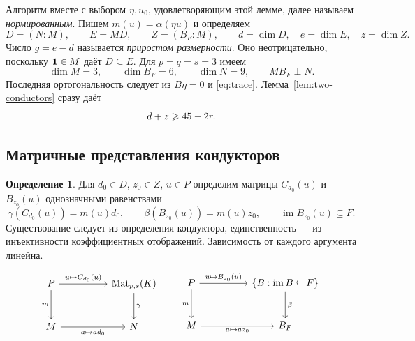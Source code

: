 \documentclass[11pt,a4paper]{article}
\numberwithin{equation}{section}
\theoremstyle{plain}
\theoremstyle{definition}
\newtheorem{definition}[theorem]{Определение}
\DeclareMathOperator{\im}{im}\DeclareMathOperator{\supp}{supp}
\DeclareMathOperator{\Mat}{Mat}\DeclareMathOperator{\Span}{span}
\begin{document}
Алгоритм вместе с выбором $\eta,u_0$, удовлетворяющим этой лемме,
далее называем \emph{нормированным}.
Пишем $m(u)=\alpha(\eta u)$ и определяем
\[
 D=(N:M),\qquad E=MD,\qquad Z=(B_F:M),\qquad
 d=\dim D,\quad e=\dim E,\quad z=\dim Z.
\]
Число $g=e-d$ называется \emph{приростом размерности}.
Оно неотрицательно, поскольку $\mathbf1\in M$ даёт $D\subseteq E$.
Для $p=q=s=3$ имеем
\[
 \dim M=3,\qquad\dim B_F=6,\qquad\dim N=9,\qquad MB_F\perp N.
\]
Последняя ортогональность следует из $B\eta=0$ и \eqref{eq:trace}.
Лемма~\ref{lem:two-conductors} сразу даёт
\begin{equation}\label{eq:dz}
 d+z\geqslant45-2r.
\end{equation}

\subsection{Матричные представления кондукторов}

\begin{definition}
Для $d_0\in D$, $z_0\in Z$, $u\in P$ определим матрицы $C_{d_0}(u)$
и $B_{z_0}(u)$ однозначными равенствами
\[
 \gamma(C_{d_0}(u))=m(u)d_0,\qquad
 \beta(B_{z_0}(u))=m(u)z_0,\qquad \im B_{z_0}(u)\subseteq F.
\]
Существование следует из определения кондуктора, единственность ---
из инъективности коэффициентных отображений. Зависимость от каждого
аргумента линейна.
\end{definition}
\[
\begin{tikzcd}[column sep=huge,row sep=large]
 P\arrow[r,"u\mapsto C_{d_0}(u)"]\arrow[d,"m"']&
 \Mat_{p,s}(K)\arrow[d,"\gamma"]\\
 M\arrow[r,"a\mapsto ad_0"']&N
\end{tikzcd}
\qquad
\begin{tikzcd}[column sep=huge,row sep=large]
 P\arrow[r,"u\mapsto B_{z_0}(u)"]\arrow[d,"m"']&
 \{B:\im B\subseteq F\}\arrow[d,"\beta"]\\
 M\arrow[r,"a\mapsto az_0"']&B_F
\end{tikzcd}
\]
\end{document}
